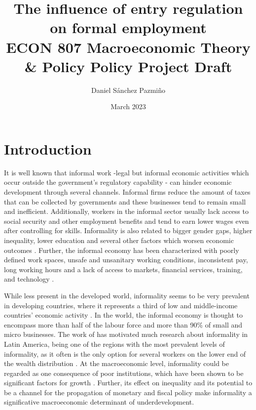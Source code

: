 \documentclass[11pt,a4paper]{article}\usepackage[]{graphicx}\usepackage[]{xcolor}
\title{The influence of entry regulation on formal employment \\[1em] 
\large{ECON 807 Macroeconomic Theory \& Policy Policy Project Draft}}
\author{Daniel Sánchez Pazmiño}
\date{March 2023}
\begin{document}
\maketitle

\begin{abstract}

\lipsum[1]

\end{abstract}

\section{Introduction}

It is well known that informal work -legal but informal economic activities which occur outside the government's regulatory capability \parencite{Sassen.1994} - can hinder economic development through several channels. Informal firms reduce the amount of taxes that can be collected by governments and these businesses tend to remain small and inefficient. Additionally, workers in the informal sector usually lack access to social security and other employment benefits and tend to earn lower wages even after controlling for skills. Informality is also related to bigger gender gaps, higher inequality, lower education and several other factors which worsen economic outcomes \parencite{Delechat2020}. Further, the informal economy has been characterized with poorly defined work spaces, unsafe and unsanitary working conditions, inconsistent pay, long working hours and a lack of access to markets, financial services, training, and technology \parencite{IloND}. 

While less present in the developed world, informality seems to be very prevalent in developing countries, where it represents a third of low and middle-income countries' economic activity \parencite{Delechat2020}. In the world, the informal economy is thought to encompass more than half of the labour force and more than 90\% of small and micro businesses. The work of \textcite{Soto.2002} has motivated much research about informality in Latin America, being one of the regions with the most prevalent levels of informality, as it often is the only option for several workers on the lower end of the wealth distribution \parencite{Oviedo.2009}. At the macroeconomic level, informality could be regarded as one consequence of poor institutions, which have been shown to be significant factors for growth \parencite{Acemoglu.2001, RafaelLaPorta.1997, Glaeser.2004}. Further, its effect on inequality and its potential to be a channel for the propagation of monetary and fiscal policy \textcite{Alberola.2020} make informality a significative macroeconomic determinant of underdevelopment.
\end{document}
